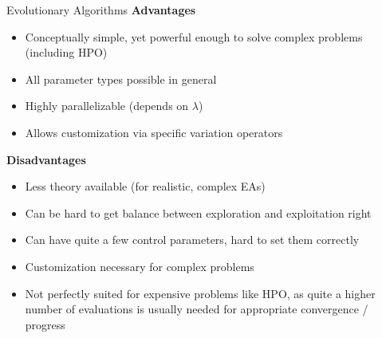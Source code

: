 \documentclass[11pt,compress,t,notes=noshow, xcolor=table]{beamer}
\begin{document}
\begin{vbframe}{Evolutionary Algorithms}
\footnotesize
\textbf{Advantages}
  \begin{itemize}
    \item Conceptually simple, yet powerful enough to solve complex problems (including HPO)
    \item All parameter types possible in general
    \item Highly parallelizable (depends on $\lambda$)
    \item Allows customization via specific variation operators
  \end{itemize}
\textbf{Disadvantages}
    \begin{itemize}
      \item Less theory available (for realistic, complex EAs)
      \item Can be hard to get balance between exploration and exploitation right
      \item Can have quite a few control parameters, hard to set them correctly\\
      \item Customization necessary for complex problems
      \item Not perfectly suited for expensive problems like HPO, 
            as quite a higher number of evaluations is usually
            needed for appropriate convergence / progress
    \end{itemize}

\end{vbframe}





\end{document}
